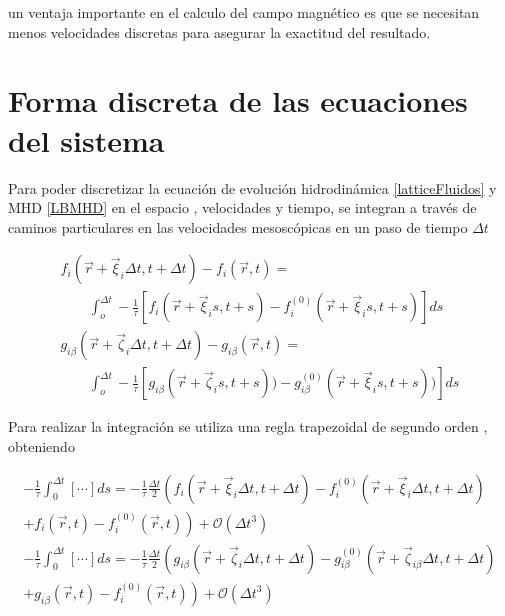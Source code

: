 \noindent un ventaja importante en el calculo del campo magnético es que se necesitan  menos velocidades discretas para asegurar la exactitud del resultado. 

\section{Forma discreta de las ecuaciones del sistema}

\noindent Para poder discretizar la ecuación de evolución hidrodinámica \eqref{latticeFluidos} y MHD \eqref{LBMHD} en el espacio , velocidades y tiempo, se integran a través de caminos particulares en las velocidades mesoscópicas en un paso de tiempo $\Delta t$

\begin{eqnarray}
    f_{i}(\vec{r}+\vec{\xi}_{i}\Delta t, t+\Delta t) - f_{i}(\vec{r},t)=\qquad\nonumber\\
    \qquad \int_{o}^{\Delta t}-\frac{1}{\tau}\left[f_{i}(\vec{r}+\vec{\xi}_{i}s,t+s)-f_{i}^{(0)}(\vec{r}+\vec{\xi}_{i}s,t+s)\right]ds\\
    g_{i\beta}(\vec{r}+\vec{\zeta}_{i}\Delta t, t+\Delta t) - g_{i\beta}(\vec{r},t)=\qquad\nonumber\\
    \qquad\int_{o}^{\Delta t}-\frac{1}{\tau}\left[g_{i\beta}(\vec{r}+\vec{\zeta}_{i}s,t+s))-g_{i\beta}^{(0)}(\vec{r}+\vec{\xi}_{i}s,t+s))\right]ds
\end{eqnarray}

Para realizar la integración se utiliza una regla trapezoidal de segundo orden , obteniendo

\begin{eqnarray}
    -\frac{1}{\tau}\int_{0}^{\Delta t}\left[\cdots\right]ds = -\frac{1}{\tau}\frac{\Delta t}{2}\left(f_{i}(\vec{r}+\vec{\xi}_{i}\Delta t,t+\Delta t)-f_{i}^{(0)}(\vec{r}+\vec{\xi}_{i}\Delta t,t+\Delta t)\nonumber \right.\\
    \left. +f_{i}(\vec{r},t)-f_{i}^{(0)}(\vec{r}, t)
    \right) + \mathcal{O}(\Delta t^{3})\\
      -\frac{1}{\tau}\int_{0}^{\Delta t}\left[\cdots\right]ds = -\frac{1}{\tau}\frac{\Delta t}{2}\left(g_{i\beta}(\vec{r}+\vec{\zeta}_{i}\Delta t,t+\Delta t)-g_{i\beta}^{(0)}(\vec{r}+\vec{\zeta}_{i\beta}\Delta t,t+\Delta t)\nonumber \right.\\
    \left. +g_{i\beta}(\vec{r},t)-f_{i}^{(0)}(\vec{r}, t)
    \right) + \mathcal{O}(\Delta t^{3})
\end{eqnarray}

